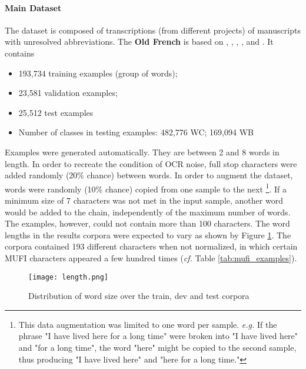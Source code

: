 \documentclass{jdmdh}
\begin{document}
\paragraph{Main Dataset}

The dataset is composed of transcriptions (from different projects) of manuscripts with unresolved abbreviations. The \textbf{Old French} is based on \citet{8269990}, \citet{pinche:hal-01628533}, \citet{jean_baptiste_camps_2019_2630574}, \citet{bfmmss}, and \citet{tnah_transcription}. It contains

\begin{itemize}
    \item 193,734 training examples (group of words);
    \item 23,581 validation examples;
    \item 25,512 test examples
    \item Number of classes in testing examples: 482,776 WC; 169,094 WB
\end{itemize}

Examples were generated automatically. They are between 2 and 8 words in length. In order to recreate the condition of OCR noise, full stop characters were added randomly (20\% chance) between words. In order to augment the dataset, words were randomly (10\% chance) copied from one sample to the next \footnote{This data augmentation was limited to one word per sample. \textit{e.g.} If the phrase "I have lived here for a long time" were broken into "I have lived here" and "for a long time", the word "here" might be copied to the second sample, thus producing "I have lived here" and "here for a long time."}. If a minimum size of 7 characters was not met in the input sample, another word would be added to the chain, independently of the maximum number of words. The examples, however, could not contain more than 100 characters. The word lengths in the results corpora were expected to vary as shown by Figure \ref{fig:word_sizes}. The corpora contained 193 different characters when not normalized, in which certain MUFI characters appeared a few hundred times (\textit{cf.} Table \ref{tab:mufi_examples}).

\begin{figure}[!ht]
  \centering
  \texttt{[image: length.png]}
  \caption{Distribution of word size over the train, dev and test corpora}
  \label{fig:word_sizes}
\end{figure}
\end{document}
